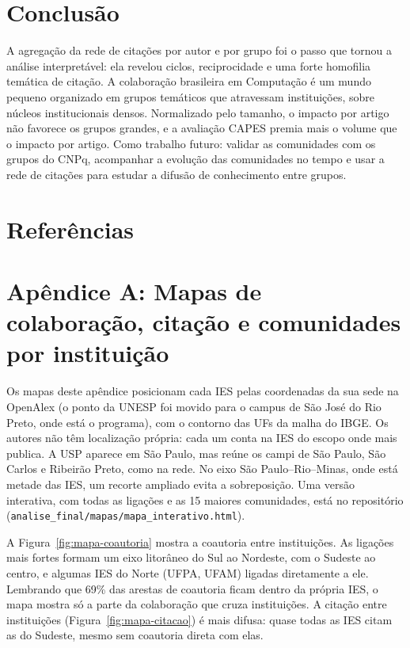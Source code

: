\documentclass[12pt]{projeto}
\begin{document}
\section{Conclusão}

A agregação da rede de citações por autor e por grupo foi o passo que tornou a análise interpretável: ela revelou ciclos, reciprocidade e uma forte homofilia temática de citação. A colaboração brasileira em Computação é um mundo pequeno organizado em grupos temáticos que atravessam instituições, sobre núcleos institucionais densos. Normalizado pelo tamanho, o impacto por artigo não favorece os grupos grandes, e a avaliação CAPES premia mais o volume que o impacto por artigo. Como trabalho futuro: validar as comunidades com os grupos do CNPq, acompanhar a evolução das comunidades no tempo e usar a rede de citações para estudar a difusão de conhecimento entre grupos.

\section*{Referências}

\clearpage
\section*{Apêndice A: Mapas de colaboração, citação e comunidades por instituição}
\label{ap:mapas}

Os mapas deste apêndice posicionam cada IES pelas coordenadas da sua sede na OpenAlex (o ponto da UNESP foi movido para o campus de São José do Rio Preto, onde está o programa), com o contorno das UFs da malha do IBGE. Os autores não têm localização própria: cada um conta na IES do escopo onde mais publica. A USP aparece em São Paulo, mas reúne os campi de São Paulo, São Carlos e Ribeirão Preto, como na rede. No eixo São Paulo--Rio--Minas, onde está metade das IES, um recorte ampliado evita a sobreposição. Uma versão interativa, com todas as ligações e as 15 maiores comunidades, está no repositório (\texttt{analise\_final/mapas/mapa\_interativo.html}).

A Figura~\ref{fig:mapa-coautoria} mostra a coautoria entre instituições. As ligações mais fortes formam um eixo litorâneo do Sul ao Nordeste, com o Sudeste ao centro, e algumas IES do Norte (UFPA, UFAM) ligadas diretamente a ele. Lembrando que 69\% das arestas de coautoria ficam dentro da própria IES, o mapa mostra só a parte da colaboração que cruza instituições. A citação entre instituições (Figura~\ref{fig:mapa-citacao}) é mais difusa: quase todas as IES citam as do Sudeste, mesmo sem coautoria direta com elas.
\end{document}
